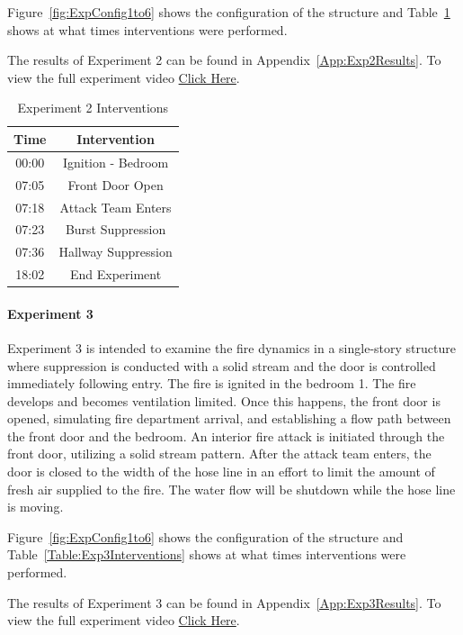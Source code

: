 \documentclass[12pt,oneside]{book}
\begin{document}
Figure~\ref{fig:ExpConfig1to6} shows the configuration of the structure and Table~\ref{Table:Exp2Interventions} shows at what times interventions were performed. 

The results of Experiment 2 can be found in Appendix~\ref{App:Exp2Results}. To view the full experiment video \href{https://youtu.be/gl8rc1Nsl1k}{Click Here}.

\begin{table}[H]
	\centering
	\caption{Experiment 2 Interventions}
	\begin{tabular}{|c|c|} 
		\hline
		Time & Intervention \\ \hline \hline
		00:00 & Ignition - Bedroom \\ \hline
		07:05 & Front Door Open \\ \hline
		07:18 & Attack Team Enters\\ \hline
		07:23 & Burst Suppression \\ \hline 
		07:36 & Hallway Suppression \\ \hline
		18:02 & End Experiment\\ \hline
	\end{tabular}
	\label{Table:Exp2Interventions}
\end{table}

\clearpage

\paragraph{Experiment 3} \mbox{}

Experiment 3 is intended to examine the fire dynamics in a single-story structure where suppression is conducted with a solid stream and the door is controlled immediately following entry. The fire is ignited in the bedroom 1. The fire develops and becomes ventilation limited. Once this happens, the front door is opened, simulating fire department arrival, and establishing a flow path between the front door and the bedroom. An interior fire attack is initiated through the front door, utilizing a solid stream pattern. After the attack team enters, the door is closed to the width of the hose line in an effort to limit the amount of fresh air supplied to the fire. The water flow will be shutdown while the hose line is moving.

Figure~\ref{fig:ExpConfig1to6} shows the configuration of the structure and Table~\ref{Table:Exp3Interventions} shows at what times interventions were performed. 

The results of Experiment 3 can be found in Appendix~\ref{App:Exp3Results}. To view the full experiment video \href{https://youtu.be/gl8rc1Nsl1k}{Click Here}.
\end{document}
